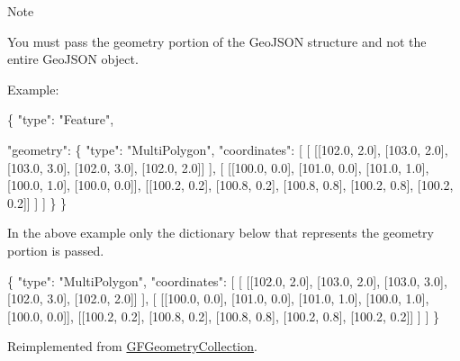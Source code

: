 \begin{DoxyNote}{Note}


You must pass the geometry portion of the Geo\+J\+S\+O\+N structure and not the entire Geo\+J\+S\+O\+N object.

Example\+:


\begin{DoxyCode}
\{
      \textcolor{stringliteral}{"type"}: \textcolor{stringliteral}{"Feature"},

      \textcolor{stringliteral}{"geometry"}: \{
                      \textcolor{stringliteral}{"type"}: \textcolor{stringliteral}{"MultiPolygon"},
                      \textcolor{stringliteral}{"coordinates"}: [
                           [
                              [[102.0, 2.0], [103.0, 2.0], [103.0, 3.0], [102.0, 3.0], [102.0, 2.0]]
                           ],
                           [
                              [[100.0, 0.0], [101.0, 0.0], [101.0, 1.0], [100.0, 1.0], [100.0, 0.0]],
                              [[100.2, 0.2], [100.8, 0.2], [100.8, 0.8], [100.2, 0.8], [100.2, 0.2]]
                           ]
                      ]
                  \}
 \}
\end{DoxyCode}


In the above example only the dictionary below that represents the geometry portion is passed.


\begin{DoxyCode}
 \{
     \textcolor{stringliteral}{"type"}: \textcolor{stringliteral}{"MultiPolygon"},
     \textcolor{stringliteral}{"coordinates"}: [
          [
            [[102.0, 2.0], [103.0, 2.0], [103.0, 3.0], [102.0, 3.0], [102.0, 2.0]]
          ],
          [
            [[100.0, 0.0], [101.0, 0.0], [101.0, 1.0], [100.0, 1.0], [100.0, 0.0]],
            [[100.2, 0.2], [100.8, 0.2], [100.8, 0.8], [100.2, 0.8], [100.2, 0.2]]
          ]
       ]
\}
\end{DoxyCode}
 
\end{DoxyNote}


Reimplemented from \hyperlink{interface_g_f_geometry_collection_adc8a317a694f82808d1e02e53e300f8f}{G\+F\+Geometry\+Collection}.

\hypertarget{interface_g_f_multi_polygon_acc419d7ae28145fa7d47186b9d125e98}{}
